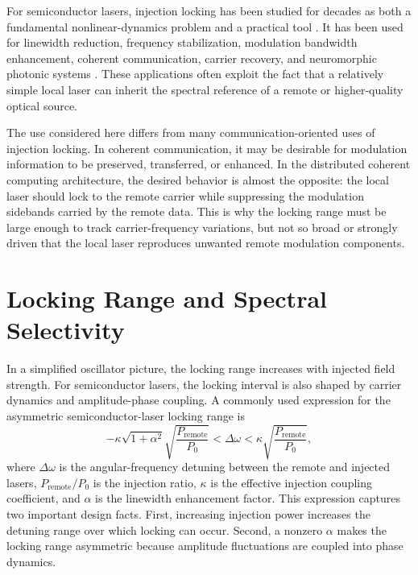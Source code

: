 For semiconductor lasers, injection locking has been studied for decades as both a fundamental nonlinear-dynamics problem and a practical tool \cite{lang1982injection,mogensen1985locking,liu2020optical}. It has been used for linewidth reduction, frequency stabilization, modulation bandwidth enhancement, coherent communication, carrier recovery, and neuromorphic photonic systems \cite{liu2015homodyne,lau2009enhanced}. These applications often exploit the fact that a relatively simple local laser can inherit the spectral reference of a remote or higher-quality optical source.

The use considered here differs from many communication-oriented uses of injection locking. In coherent communication, it may be desirable for modulation information to be preserved, transferred, or enhanced. In the distributed coherent computing architecture, the desired behavior is almost the opposite: the local laser should lock to the remote carrier while suppressing the modulation sidebands carried by the remote data. This is why the locking range must be large enough to track carrier-frequency variations, but not so broad or strongly driven that the local laser reproduces unwanted remote modulation components.

\section{Locking Range and Spectral Selectivity}

In a simplified oscillator picture, the locking range increases with injected field strength. For semiconductor lasers, the locking interval is also shaped by carrier dynamics and amplitude-phase coupling. A commonly used expression for the asymmetric semiconductor-laser locking range is
\begin{equation}
    -\kappa \sqrt{1+\alpha^2}\sqrt{\frac{P_{\mathrm{remote}}}{P_0}}
    < \Delta\omega <
    \kappa \sqrt{\frac{P_{\mathrm{remote}}}{P_0}},
    \label{eq:semiconductor_locking_range}
\end{equation}
where $\Delta\omega$ is the angular-frequency detuning between the remote and injected lasers, $P_{\mathrm{remote}}/P_0$ is the injection ratio, $\kappa$ is the effective injection coupling coefficient, and $\alpha$ is the linewidth enhancement factor. This expression captures two important design facts. First, increasing injection power increases the detuning range over which locking can occur. Second, a nonzero $\alpha$ makes the locking range asymmetric because amplitude fluctuations are coupled into phase dynamics.

